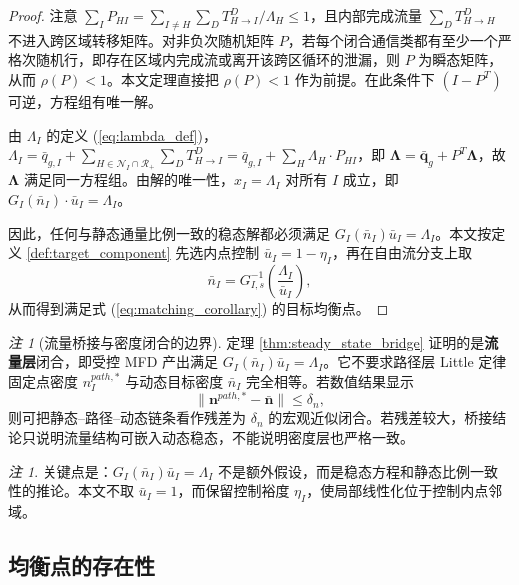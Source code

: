 \documentclass[a4paper,12pt]{article}
\theoremstyle{plain}
\theoremstyle{definition}
\theoremstyle{remark}
\newtheorem{remark}[theorem]{注}
\begin{document}
\begin{proof}
注意 $\sum_I P_{HI} = \sum_{I\ne H}\sum_D T_{H \to I}^D / \Lambda_H \leq 1$，且内部完成流量 $\sum_D T_{H \to H}^D$ 不进入跨区域转移矩阵。对非负次随机矩阵 $P$，若每个闭合通信类都有至少一个严格次随机行，即存在区域内完成流或离开该跨区循环的泄漏，则 $P$ 为瞬态矩阵，从而 $\rho(P)<1$。本文定理直接把 $\rho(P)<1$ 作为前提。在此条件下 $(I-P^T)$ 可逆，方程组有唯一解。

由 $\Lambda_I$ 的定义 (\ref{eq:lambda_def})，$\Lambda_I = \bar{q}_{g,I} + \sum_{H\in\mathcal N_I\cap\mathcal R_+} \sum_D T_{H \to I}^D = \bar{q}_{g,I} + \sum_H \Lambda_H \cdot P_{HI}$，即 $\bm{\Lambda} = \bar{\bm{q}}_g + P^T \bm{\Lambda}$，故 $\bm{\Lambda}$ 满足同一方程组。由解的唯一性，$x_I = \Lambda_I$ 对所有 $I$ 成立，即 $G_I(\bar{n}_I) \cdot \bar{u}_I = \Lambda_I$。

因此，任何与静态通量比例一致的稳态解都必须满足 $G_I(\bar n_I)\bar u_I=\Lambda_I$。本文按定义 \ref{def:target_component} 先选内点控制 $\bar u_I=1-\eta_I$，再在自由流分支上取
\begin{equation}
    \bar n_I=G_{I,s}^{-1}\left(\frac{\Lambda_I}{\bar u_I}\right),
\end{equation}
从而得到满足式 (\ref{eq:matching_corollary}) 的目标均衡点。
\end{proof}

\begin{remark}[流量桥接与密度闭合的边界]\label{rem:flow_density_bridge_boundary}
定理 \ref{thm:steady_state_bridge} 证明的是\textbf{流量层}闭合，即受控 MFD 产出满足 $G_I(\bar n_I)\bar u_I=\Lambda_I$。它不要求路径层 Little 定律固定点密度 $n_I^{path,*}$ 与动态目标密度 $\bar n_I$ 完全相等。若数值结果显示
\begin{equation}
    \| \bm n^{path,*}-\bar{\bm n}\|\le \delta_n ,
\end{equation}
则可把静态--路径--动态链条看作残差为 $\delta_n$ 的宏观近似闭合。若残差较大，桥接结论只说明流量结构可嵌入动态稳态，不能说明密度层也严格一致。
\end{remark}

\begin{remark}
关键点是：$G_I(\bar{n}_I)\bar u_I = \Lambda_I$ 不是额外假设，而是稳态方程和静态比例一致性的推论。本文不取 $\bar u_I=1$，而保留控制裕度 $\eta_I$，使局部线性化位于控制内点邻域。
\end{remark}

\subsection{均衡点的存在性}
\end{document}
